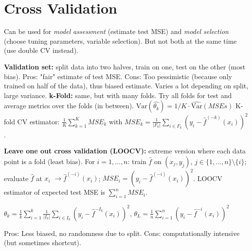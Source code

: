 \section*{Cross Validation}
Can be used for \textit{model assessment} (estimate test MSE) and \textit{model selection} (choose tuning parameters, variable selection). 
But not both at the same time (use double CV instead).

\textbf{Validation set:} split data into two halves, train on one, test on the other (most bias).
Pros: "fair" estimate of test MSE.
Cons: Too pessimistic (because only trained on half of the data), thus biased estimate.
Varies a lot depending on split, large variance.
\textbf{k-Fold:} same, but with many folds.
Try all folds for test and average metrics over the folds (in between). $\text{Var}(\hat {\theta_k}) = 1/K \cdot \hat {\text{Var}}(MSEs)$
K-fold CV estimator: 
$\frac{1}{K}\sum_{k=1}^K MSE_k$ with $MSE_k = \frac{1}{|F_k|}\sum_{i\in F_k} (y_i-\hat f^{(-k)}(x_i))^2$.

\textbf{Leave one out cross validation (LOOCV):} extreme version where each data point is a fold (least bias).
For $i=1,...,n$: train $\hat f$ on $(x_j,y_j)$, $j\in \{1,...,n\}\setminus \{i\}$; 
evaluate $\hat f$ at $x_i$ $\rightarrow \hat f^{(-i)}(x_i)$; $MSE_i=(y_i-\hat f^{(-i)}(x_i))^2$.
LOOCV estimator of expected test MSE is $\sum_{i=1}^n MSE_i$.

$\theta_k = \tfrac 1 k \sum_{i=1}^k \tfrac 1 {|I_k|} \sum_{i\in I_k} (y_i - \hat f^{-I_k}(x_i))^2$,
$\theta_{L} = \tfrac 1 n \sum_{i=1}^n (y_i - \hat f^{-i}(x_i))^2$

Pros: Less biased, no randomness due to split. 
Cons: computationally intensive (but sometimes shortcut).
